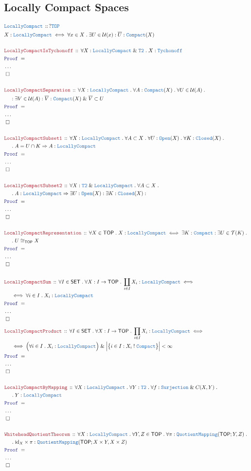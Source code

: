 \documentclass[12pt]{scrartcl}
\newcommand{\TYPE}[1]{\textcolor{NavyBlue}{\mathtt{#1}}}
\newcommand{\LOGIC}[1]{\textcolor{Blue}{\mathtt{#1}}}
\newcommand{\THM}[1]{\textcolor{Maroon}{\mathtt{#1}}}
\renewcommand{\.}{\; . \;}
\newcommand{\IsNot}{\; ! \;}
\newcommand{\Theorem}[2]{& \THM{#1} \, :: \, #2 \\ & \Proof = \\ }
\newcommand{\DeclareType}[2]{& \TYPE{#1} \, :: \, #2 \\}
\newcommand{\DefineType}[3]{& #1 : \TYPE{#2} \iff #3 \\}
\newcommand{\NewLine}{\\ & \kern 1pc}
\newcommand{\Page}[1]{ \begin{align*} #1 \end{align*}   }
\newcommand{\NoProof}{ & \ldots \\ \EndProof}
\renewcommand{\And}{\; \& \;}
\newcommand{\Imply}{\Rightarrow}
\DeclareMathOperator*{\id}{id}
\newcommand{\QED}{\; \square}
\newcommand{\EndProof}{& \QED \\}
\newcommand{\Proof}{\LOGIC{Proof} \; }
\newcommand{\SET}{\mathsf{SET}}
\newcommand{\TOP}{\mathsf{TOP}}
\newcommand{\T}{\mathcal{T}}
\newcommand{\U}{\mathcal{U}}
\begin{document}
\subsection{Locally Compact Spaces}
\Page{
	\DeclareType{LocallyCompact}{?\TYPE{TOP}}
	\DefineType{X}{LocallyCompact}{\forall x \in X \. \exists U \in \U(x) : \overline{U} : \TYPE{Compact}(X) }
	\\
	\Theorem{LocallyCompactIsTychonoff}{\forall X : \TYPE{LocallyCompact} \And \TYPE{T2} \. X : \TYPE{Tychonoff} }
	\NoProof
	\\
	\Theorem{LocallyCompactSeparation}
	{
		\forall X : \TYPE{LocallyCompact} \.
		\forall A : \TYPE{Compact}(X) \.
		\forall U \in \U(A) \. \NewLine : 
		\exists V \in \U(A) : 
		\overline{V} : \TYPE{Compact}(X) \And \overline{V} \subset U
	}
	\NoProof
	\\
	\Theorem{LocallyCompactSubset1}
	{
		\forall X : \TYPE{LocallyCompact} \.
		\forall A \subset X \.
		\forall U : \TYPE{Open}(X) \.
		\forall K : \TYPE{Closed}(X) \. \NewLine \. 
		A = U \cap K \Imply  A : \TYPE{LocallyCompact}
	}
	\NoProof
	\\
	\Theorem{LocallyCompactSubset2}
	{
		\forall X : \TYPE{T2} \And \TYPE{LocallyCompact} \.
		\forall A \subset X \. \NewLine \.
		A : \TYPE{LocallyCompact} \Imply \exists U : \TYPE{Open}(X) :
		\exists K : \TYPE{Closed}(X) :
	}
	\NoProof
	\\
	\Theorem{LocallyCompactRepresentation}
	{
		\forall X  \in \TOP \.
		X : \TYPE{LocallyCompact} \iff \exists K : \TYPE{Compact} : \exists U \in \T(K) \. 
		\NewLine \.
		U \cong_{\TOP} X
	}
	\NoProof
	\\
	\Theorem{LocallyCompactSum}
	{
		\forall I \in \SET \. \forall X : I \to \TOP \. 
		\coprod_{i\in I} X_i : \TYPE{LocallyCompact} \iff \NewLine \iff 
		\forall i \in I \. X_i : \TYPE{LocallyCompact}
	}
	\NoProof
}\Page{
	\Theorem{LocallyCompactProduct}
	{
		\forall I \in \SET \. \forall X : I \to \TOP \. 
		\prod_{i\in I} X_i : \TYPE{LocallyCompact} \iff \NewLine \iff 
		\Big(\forall i \in I \. X_i : \TYPE{LocallyCompact} \Big)
		\And  \Big|\big\{ i \in I : X_i \IsNot \TYPE{Compact}  \big\}\Big| < \infty
	}
	\NoProof
	\\
	\Theorem{LocallyCompactByMapping}
	{
		\forall X : \TYPE{LocallyCompact} \.
		\forall Y : \TYPE{T2} \.
		\forall f : \TYPE{Surjection} \And C(X,Y) \. \NewLine \.
		Y : \TYPE{LocallyCompact}
	}
	\NoProof
	\\
	\Theorem{WhiteheadQuotientTheorem}
	{
		\forall X : \TYPE{LocallyCompact} \.
		\forall Y,Z \in \TOP \.
		\forall \pi : \TYPE{QuotientMapping}(\TOP;Y,Z) \. \NewLine \. 
		{\id}_X \times \pi : \TYPE{QuotientMapping}(\TOP;X \times Y,X \times Z)
	}
	\NoProof
}
\newpage
\end{document}

